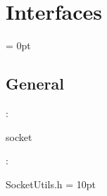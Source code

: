 
\section{Interfaces} 


\parskip = 0pt

\vspace{3mm} \subsection*{General}

: 

socket
\vspace{2mm}

\vspace{5mm}

: 



SocketUtils.h
\vspace{2mm}\parskip = 10pt 
